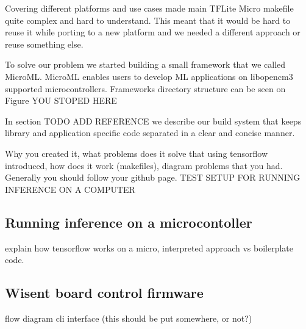 Covering different platforms and use cases made main TFLite Micro makefile quite complex and hard to understand.
This meant that it would be hard to reuse it while porting to a new platform and we needed a different approach or reuse something else.

To solve our problem we started building a small framework that we called MicroML\footnotemark.
MicroML enables users to develop ML applications on libopencm3 supported microcontrollers.
Frameworks directory structure can be seen on Figure YOU STOPED HERE




In section TODO ADD REFERENCE we describe our build system that keeps library and application specific code separated in a clear and concise manner.


    Why you created it, 
    what problems does it solve that using tensorflow introduced, 
    how does it work (makefiles), diagram
    problems that you had. 
    Generally you should follow your github page. 
    TEST SETUP FOR RUNNING INFERENCE ON A COMPUTER

\subsection{ Running inference on a microcontoller}
    explain how tensorflow works on a micro, interpreted approach vs boilerplate code. 

\subsection{ Wisent board control firmware}
    flow diagram
    cli interface (this should be put somewhere, or not?)





